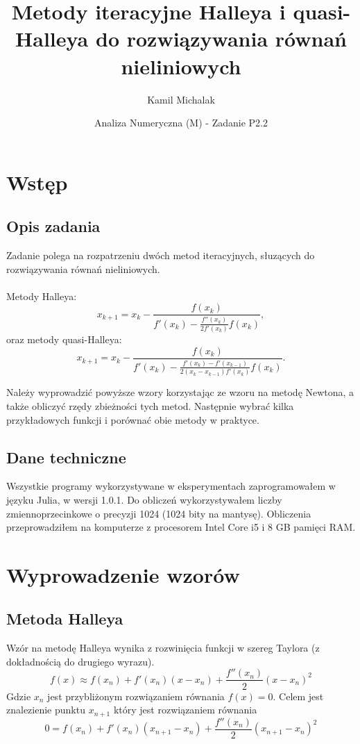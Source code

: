 \documentclass[11pt,a4paper]{article}
\title{Metody iteracyjne Halleya i quasi-Halleya do rozwiązywania równań nieliniowych}
\author{Kamil Michalak}
\date{Analiza Numeryczna (M) - Zadanie P2.2}
\begin{document}
    \maketitle

    \section{Wstęp}
    \subsection{Opis zadania}
    Zadanie polega na rozpatrzeniu dwóch metod iteracyjnych, słuzących do rozwiązywania równań nieliniowych.\\\\
    Metody Halleya:
    $$
        x_{k+1} = x_k - \frac{f(x_k)}{f'(x_k)-\frac{f''(x_k)}{2f'(x_k)}f(x_k)},
    $$
    oraz metody quasi-Halleya:
    $$
        x_{k+1} = x_k - \frac{f(x_k)}{f'(x_k)-\frac{f'(x_k)-f'(x_{k-1})}{2(x_k-x_{k-1})f'(x_k)}f(x_k)}.
    $$

    Należy wyprowadzić powyższe wzory korzystając ze wzoru na metodę Newtona, a także obliczyć rzędy zbieżności tych metod. Następnie wybrać kilka przykładowych funkcji i porównać obie metody w praktyce.
    \subsection{Dane techniczne}
    Wszystkie programy wykorzystywane w eksperymentach zaprogramowałem w języku Julia, w wersji 1.0.1. Do obliczeń wykorzystywałem liczby zmiennoprzecinkowe o precyzji 1024 (1024 bity na mantysę). Obliczenia przeprowadziłem na komputerze z procesorem Intel Core i5 i 8 GB pamięci RAM.
    \section{Wyprowadzenie wzorów}
    \subsection{Metoda Halleya}
    Wzór na metodę Halleya wynika z rozwinięcia funkcji w szereg Taylora (z dokładnością do drugiego wyrazu).
    $$
        f(x) \approx f(x_n) + f'(x_n)(x-x_n) + \frac{f''(x_n)}{2}(x-x_n)^2
    $$
    Gdzie $x_n$ jest przybliżonym rozwiązaniem równania $f(x) = 0$. Celem jest znalezienie punktu $x_{n+1}$ który jest rozwiązaniem równania
    $$
        0 = f(x_n) + f'(x_n)(x_{n+1}-x_n) + \frac{f''(x_n)}{2}(x_{n+1}-x_n)^2
    $$
\end{document}
